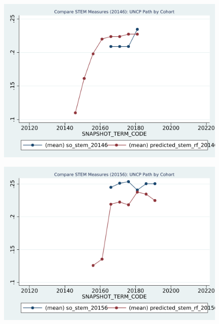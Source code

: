 \begin{figure}[h!]
\begin{centering}
\includegraphics[scale=1]{"figures/UNCP_20146_COMPARE_path_by_cohort_CAREER_STEM"}
\end{centering}
\end{figure}
\newpage
\begin{figure}[h!]
\begin{centering}
\includegraphics[scale=1]{"figures/UNCP_20156_COMPARE_path_by_cohort_CAREER_STEM"}
\end{centering}
\end{figure}
\newpage
